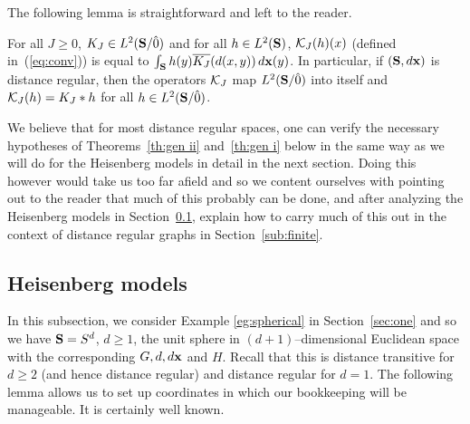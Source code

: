 The following lemma is straightforward and left to the reader.

\begin{lem} \label{lem:dt}
For all $J\ge 0$, $K_J\in \ltsg$ and for all $h\in \lts$,
$\K_J(h)(x)$ (defined in~(\ref{eq:conv})) is equal to 
$\int_{\S} h(y) \overline{K_J} (d(x,y)) \, \dx (y)$.
In particular, if $(\S , \dx)$ is distance regular, 
then the operators $\K_J$ map $\ltsg$ into itself and 
$\K_J(h) =K_J * h$ for all $h \in \ltsg$.
\end{lem}

We believe that for most distance regular spaces, one can verify the 
necessary hypotheses of Theorems~\ref{th:gen ii} and~\ref{th:gen i} 
below in the same way as
we will do for the Heisenberg models in detail 
in the next section. Doing this however
would take us too far afield and so we content ourselves with pointing out
to the reader that much of this probably can be done, and after analyzing
the Heisenberg models in Section~\ref{sub:sphere}, 
explain how to carry much of this out in the context of distance regular 
graphs in Section~\ref{sub:finite}.  

\subsection{Heisenberg models} \label{sub:sphere}

In this subsection, we consider Example \ref{eg:spherical} in  
Section~\ref{sec:one}
and so we have $\S = S^d$, $d \geq 1$, the unit sphere in
$(d+1)$--dimensional Euclidean space with the corresponding
$G, d, \dx$ and $H$.
Recall that this is distance transitive for $d\ge 2$ (and hence 
distance regular) and distance regular for $d=1$.
The following lemma allows us to set up coordinates in which our bookkeeping
will be manageable. It is certainly well known.

